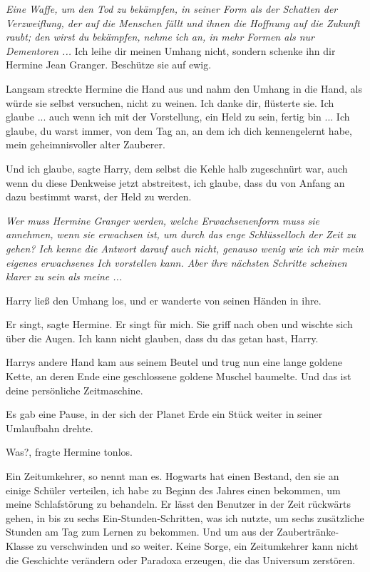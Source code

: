 \emph{Eine Waffe, um den Tod zu bekämpfen, in seiner Form als der Schatten der
Verzweiflung, der auf die Menschen fällt und ihnen die Hoffnung auf die Zukunft
raubt; den wirst du bekämpfen, nehme ich an, in mehr Formen als nur
Dementoren ...} \glqq{}Ich leihe dir meinen Umhang nicht, sondern schenke ihn dir
Hermine Jean Granger. Beschütze sie auf ewig.\grqq{}

Langsam streckte Hermine die Hand aus und nahm den Umhang in die Hand, als würde
sie selbst versuchen, nicht zu weinen. \glqq{}Ich danke dir\grqq{}, flüsterte
sie. \glqq{}Ich glaube ... auch wenn ich mit der Vorstellung, ein Held zu sein,
fertig bin ... Ich glaube, du warst immer, von dem Tag an, an dem ich dich
kennengelernt habe, mein geheimnisvoller alter Zauberer.\grqq{}

\glqq{}Und ich glaube\grqq{}, sagte Harry, dem selbst die Kehle halb zugeschnürt
war, \glqq{}auch wenn du diese Denkweise jetzt abstreitest, ich glaube, dass du
von Anfang an dazu bestimmt warst, der Held zu werden.\grqq{}

\emph{Wer muss Hermine Granger werden, welche Erwachsenenform muss sie annehmen,
wenn sie erwachsen ist, um durch das enge Schlüsselloch der Zeit zu gehen? Ich
kenne die Antwort darauf auch nicht, genauso wenig wie ich mir mein eigenes
erwachsenes Ich vorstellen kann. Aber ihre nächsten Schritte scheinen klarer zu
sein als meine ...}

Harry ließ den Umhang los, und er wanderte von seinen Händen in ihre.

\glqq{}Er singt\grqq{}, sagte Hermine. \glqq{}Er singt für mich.\grqq{} Sie griff
nach oben und wischte sich über die Augen. \glqq{}Ich kann nicht glauben, dass du
das getan hast, Harry.\grqq{}

Harrys andere Hand kam aus seinem Beutel und trug nun eine lange goldene Kette,
an deren Ende eine geschlossene goldene Muschel baumelte. \glqq{}Und das ist
deine persönliche Zeitmaschine.\grqq{}

Es gab eine Pause, in der sich der Planet Erde ein Stück weiter in seiner
Umlaufbahn drehte.

\glqq{}Was?\grqq{}, fragte Hermine tonlos.

\glqq{}Ein Zeitumkehrer, so nennt man es. Hogwarts hat einen Bestand, den sie an
einige Schüler verteilen, ich habe zu Beginn des Jahres einen bekommen, um meine
Schlafstörung zu behandeln. Er lässt den Benutzer in der Zeit rückwärts gehen,
in bis zu sechs Ein-Stunden-Schritten, was ich nutzte, um sechs zusätzliche
Stunden am Tag zum Lernen zu bekommen. Und um aus der Zaubertränke-Klasse zu
verschwinden und so weiter. Keine Sorge, ein Zeitumkehrer kann nicht die
Geschichte verändern oder Paradoxa erzeugen, die das Universum zerstören.\grqq{}

